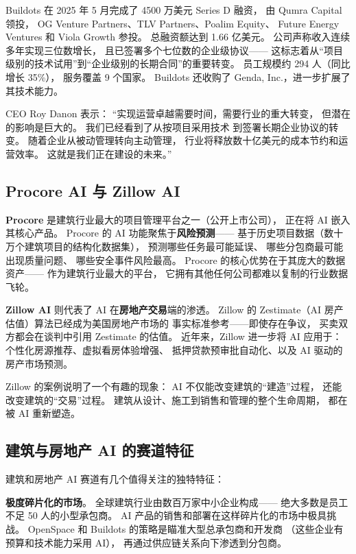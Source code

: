 Buildots 在 2025 年 5 月完成了 4500 万美元 Series D 融资，
由 Qumra Capital 领投，
OG Venture Partners、TLV Partners、Poalim Equity、
Future Energy Ventures 和 Viola Growth 参投。
总融资额达到 1.66 亿美元。
公司声称收入连续多年实现三位数增长，
且已签署多个七位数的企业级协议——
这标志着从``项目级别的技术试用''到``企业级别的长期合同''的重要转变。
员工规模约 294 人（同比增长 35\%），
服务覆盖 9 个国家。
Buildots 还收购了 Genda, Inc.，进一步扩展了其技术能力。

CEO Roy Danon 表示：
``实现运营卓越需要时间，需要行业的重大转变，
但潜在的影响是巨大的。
我们已经看到了从按项目采用技术
到签署长期企业协议的转变。
随着企业从被动管理转向主动管理，
行业将释放数十亿美元的成本节约和运营效率。
这就是我们正在建设的未来。''

\subsection{Procore AI 与 Zillow AI}

\textbf{Procore} 是建筑行业最大的项目管理平台之一（公开上市公司），
正在将 AI 嵌入其核心产品。
Procore 的 AI 功能聚焦于\textbf{风险预测}——
基于历史项目数据（数十万个建筑项目的结构化数据集），
预测哪些任务最可能延误、
哪些分包商最可能出现质量问题、
哪些安全事件风险最高。
Procore 的核心优势在于其庞大的数据资产——
作为建筑行业最大的平台，
它拥有其他任何公司都难以复制的行业数据飞轮。

\textbf{Zillow AI} 则代表了 AI 在\textbf{房地产交易}端的渗透。
Zillow 的 Zestimate（AI 房产估值）算法已经成为美国房地产市场的
事实标准参考——即使存在争议，
买卖双方都会在谈判中引用 Zestimate 的估值。
近年来，Zillow 进一步将 AI 应用于：
个性化房源推荐、虚拟看房体验增强、
抵押贷款预审批自动化、以及 AI 驱动的房产市场预测。

Zillow 的案例说明了一个有趣的现象：
AI 不仅能改变建筑的``建造''过程，
还能改变建筑的``交易''过程。
建筑从设计、施工到销售和管理的整个生命周期，
都在被 AI 重新塑造。

\subsection{建筑与房地产 AI 的赛道特征}

建筑和房地产 AI 赛道有几个值得关注的独特特征：

\textbf{极度碎片化的市场}。
全球建筑行业由数百万家中小企业构成——
绝大多数是员工不足 50 人的小型承包商。
AI 产品的销售和部署在这样碎片化的市场中极具挑战。
OpenSpace 和 Buildots 的策略是瞄准大型总承包商和开发商
（这些企业有预算和技术能力采用 AI），
再通过供应链关系向下渗透到分包商。

